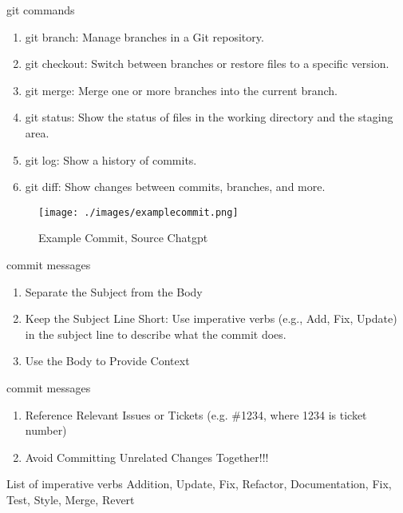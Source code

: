 \begin{frame}
    \begin{content}{git commands}
        \begin{enumerate}
            \item git branch: Manage branches in a Git repository.
            \item git checkout: Switch between branches or restore files to a specific version.
            \item git merge: Merge one or more branches into the current branch.
            \item git status: Show the status of files in the working directory and the staging area.
            \item git log: Show a history of commits.
            \item git diff: Show changes between commits, branches, and more.
        \end{enumerate}
    \end{content}
\end{frame}
\begin{frame}
    \begin{figure}    
        \texttt{[image: ./images/examplecommit.png]}
        \caption{Example Commit, Source Chatgpt} 
    \end{figure}
    \begin{content}{commit messages}
        \begin{enumerate}
            \item Separate the Subject from the Body
            \item Keep the Subject Line Short: Use imperative verbs (e.g., Add, Fix, Update) in the subject line to describe what the commit does.
            \item Use the Body to Provide Context
        \end{enumerate}
    \end{content}
\end{frame}
\begin{frame}
    \begin{content}{commit messages}
        \begin{enumerate}
            \item Reference Relevant Issues or Tickets (e.g. \#1234, where 1234 is ticket number)
            \item Avoid Committing Unrelated Changes Together!!!
        \end{enumerate}
    \end{content}
    \begin{content}{List of imperative verbs}
        Addition, Update, Fix, Refactor, Documentation, Fix, Test, Style, Merge, Revert
    \end{content}
\end{frame}